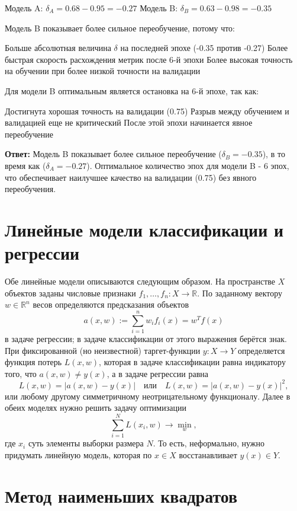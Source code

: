 Модель A: $\delta_A = 0.68 - 0.95 = -0.27$
Модель B: $\delta_B = 0.63 - 0.98 = -0.35$

Модель B показывает более сильное переобучение, потому что:

Больше абсолютная величина $\delta$ на последней эпохе (-0.35 против -0.27)
Более быстрая скорость расхождения метрик после 6-й эпохи
Более высокая точность на обучении при более низкой точности на валидации

Для модели B оптимальным является остановка на 6-й эпохе, так как:

Достигнута хорошая точность на валидации (0.75)
Разрыв между обучением и валидацией еще не критический
После этой эпохи начинается явное переобучение

\textbf{Ответ:}
Модель B показывает более сильное переобучение ($\delta_B = -0.35$), в то время как ($\delta_A = -0.27$). Оптимальное количество эпох для модели B - 6 эпох, что обеспечивает наилучшее качество на валидации (0.75) без явного переобучения.

\section{Линейные модели классификации и регрессии}

Обе линейные модели описываются следующим образом.
На пространстве $X$ объектов заданы числовые признаки \( f_1, \ldots, f_n\colon X\to\mathbb{R}\). По заданному вектору \(w\in\mathbb{R}^n\) весов определяются предсказания объектов
\[
    a(x,w) := \sum_{i=1}^n w_if_i(x) = w^Tf(x)
\]
в задаче регрессии; в задаче классификации от этого выражения берётся знак. При фиксированной (но неизвестной) таргет-функции \( y\colon X\to Y\) определяется функция потерь \( L(x, w)\), которая в задаче классификации равна индикатору того, что \(a(x,w) \neq y(x)\), а в задаче регрессии равна
\[
    L(x,w) = \lvert{a(x,w)-y(x)}\rvert
    \quad\text{или}\quad
    L(x,w) = \lvert{a(x,w)-y(x)}\rvert^2,
\]
или любому другому симметричному неотрицательному функционалу.
Далее в обеих моделях нужно решить задачу оптимизации
\[
    \sum_{i=1}^N L(x_i, w) \to \min_{w},
\]
где $x_i$ суть элементы выборки размера $N$. То есть, неформально, нужно придумать линейную модель, которая по $x \in X$ восстанавливает $y(x) \in Y$.

\section{Метод наименьших квадратов}

